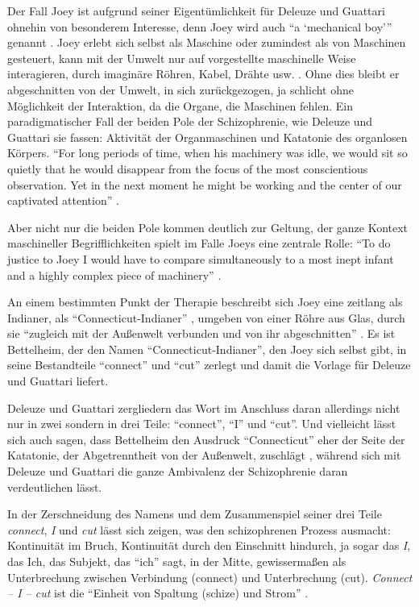 \documentclass[12pt,
               DIV13,
               paper=a4,
               twoside=false,
               onehalfspacing,
               bibliography=totoc,
               toc=graduated,
               draft,
               ]{scrartcl}
\newcommand{\pc}[2]{\parencite[#1]{#2}}
\newcommand{\vgl}[2]{\parencite[vgl.][#1]{#2}}
\newcommand{\cic}{Connect -- I -- cut\xspace}
\newcommand{\dg}{Deleuze und Guattari\xspace}
\begin{document}
Der Fall Joey ist aufgrund seiner Eigentümlichkeit für \dg ohnehin von
besonderem Interesse, denn Joey wird auch \enquote{a
\enquote{mechanical boy}} genannt \pc{3}{joey}. Joey erlebt sich
selbst als Maschine oder zumindest als von Maschinen gesteuert, kann
mit der Umwelt nur auf vorgestellte maschinelle Weise interagieren,
durch imaginäre Röhren, Kabel, Drähte usw. \vgl{3}{joey}. Ohne dies
bleibt er abgeschnitten von der Umwelt, in sich zurückgezogen, ja
schlicht ohne Möglichkeit der Interaktion, da die  Organe, die
Maschinen fehlen. Ein paradigmatischer Fall der beiden Pole der
Schizophrenie, wie \dg sie fassen: Aktivität der Organmaschinen und
Katatonie des organlosen Körpers. "`For long periods of time, when his
\glq machinery\grq{} was idle, we would sit so quietly that he would
disappear from the focus of the most conscientious observation. Yet in
the next moment he might be \glq working\grq{} and the center of our
captivated attention"' \pc{3}{joey}.

Aber nicht nur die beiden Pole kommen deutlich zur Geltung, der ganze
Kontext maschineller Begrifflichkeiten spielt im Falle Joeys eine
zentrale Rolle: "`To do justice to Joey I would have to compare
simultaneously to a most inept infant and a highly complex piece of
machinery"' \pc{3}{joey}.

An einem bestimmten Punkt der Therapie \vgl{398-404}{emptyf}
beschreibt sich Joey eine zeitlang als Indianer, als
"`Connecticut-Indianer"' \pc{399}{emptyf}, umgeben von einer Röhre aus
Glas, durch sie "`zugleich mit der Außenwelt verbunden und von ihr
abgeschnitten"' \pc{399}{emptyf}. Es ist Bettelheim, der den Namen
"`Connecticut-Indianer"', den Joey sich selbst gibt, in seine
Bestandteile "`connect"' und "`cut"' zerlegt \vgl{399}{emptyf} und
damit die Vorlage für \dg liefert.

\dg zergliedern das Wort im Anschluss daran allerdings nicht nur in
zwei sondern in drei Teile: \enquote{connect}, \enquote{I} und
\enquote{cut}. Und vielleicht lässt sich auch sagen, dass Bettelheim
den Ausdruck "`Connecticut"' eher der Seite der Katatonie, der
Abgetrenntheit von der Außenwelt, zuschlägt \vgl{403}{emptyf}, während
sich mit \dg die ganze Ambivalenz der Schizophrenie daran
verdeutlichen lässt.

In der Zerschneidung des Namens und dem Zusammenspiel seiner drei
Teile \emph{connect}, \emph{I} und \emph{cut} lässt sich
zeigen, was den schizophrenen Prozess ausmacht: Kontinuität im
Bruch, Kontinuität durch den Einschnitt hindurch, ja sogar das
\emph{I}, das Ich, das Subjekt, das "`ich"' sagt, in der Mitte,
gewissermaßen als Unterbrechung zwischen Verbindung (connect) und
Unterbrechung (cut). \emph{\cic} ist die "`Einheit von Spaltung
(schize) und Strom"' \pc{296}{ao}.
\end{document}
